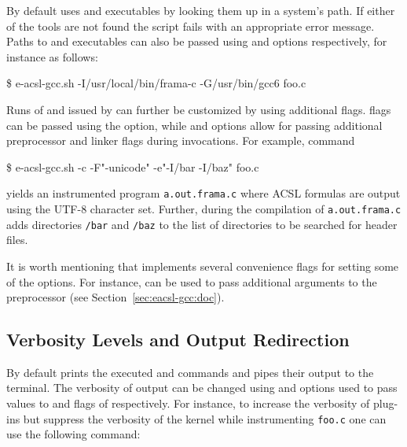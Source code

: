 By default \eacslgcc uses  and  executables by looking them
up in a system's path. If either of the tools are not found the script fails
with an appropriate error message. Paths to \framac and \gcc executables can
also be passed using  and  options
respectively, for instance as follows:

\begin{frama-c-commands}
\$ e-acsl-gcc.sh -I/usr/local/bin/frama-c -G/usr/bin/gcc6 foo.c
\end{frama-c-commands}

Runs of \framac and \gcc issued by \eacslgcc can further be customized by using
additional flags.  \framac flags can be passed using the  option,
while  and  options allow for passing additional
preprocessor and linker flags during \gcc invocations.  For example, command

\begin{frama-c-commands}
\$ e-acsl-gcc.sh -c -F"-unicode" -e"-I/bar -I/baz" foo.c
\end{frama-c-commands}

yields an instrumented program \texttt{a.out.frama.c} where ACSL formulas
are output using the UTF-8 character set. Further, during the compilation of
\texttt{a.out.frama.c} \gcc adds directories \texttt{/bar} and
\texttt{/baz} to the list of directories to be searched for header files.

It is worth mentioning that \eacslgcc implements several convenience flags for
setting some of the \framac options. For instance,  can be used to
pass additional arguments to the \framac preprocessor (see
Section~\ref{sec:eacsl-gcc:doc}).

\subsection{Verbosity Levels and Output Redirection}

By default \eacslgcc prints the executed \framac and \gcc commands and pipes
their output to the terminal. The verbosity of \framac output can be changed
using  and  options used to pass values to
 and  flags of \framac respectively.  For
instance, to increase the verbosity of plug-ins but suppress the verbosity of
the \framac kernel while instrumenting \texttt{foo.c} one can use the following
command:


